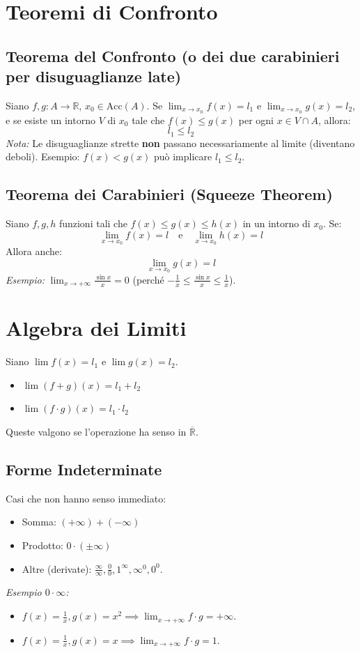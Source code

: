 \documentclass{article}
\begin{document}
\section*{Teoremi di Confronto}

\subsection*{Teorema del Confronto (o dei due carabinieri per disuguaglianze late)}
Siano $f, g: A \to \mathbb{R}$, $x_0 \in \text{Acc}(A)$.
Se $\lim_{x \to x_0} f(x) = l_1$ e $\lim_{x \to x_0} g(x) = l_2$, e se esiste un intorno $V$ di $x_0$ tale che $f(x) \le g(x)$ per ogni $x \in V \cap A$, allora:
$$ l_1 \le l_2 $$
\textit{Nota:} Le disuguaglianze strette \textbf{non} passano necessariamente al limite (diventano deboli). Esempio: $f(x) < g(x)$ può implicare $l_1 \le l_2$.

\subsection*{Teorema dei Carabinieri (Squeeze Theorem)}
Siano $f, g, h$ funzioni tali che $f(x) \le g(x) \le h(x)$ in un intorno di $x_0$.
Se:
$$ \lim_{x \to x_0} f(x) = l \quad \text{e} \quad \lim_{x \to x_0} h(x) = l $$
Allora anche:
$$ \lim_{x \to x_0} g(x) = l $$
\textit{Esempio:} $\lim_{x \to +\infty} \frac{\sin x}{x} = 0$ (perché $-\frac{1}{x} \le \frac{\sin x}{x} \le \frac{1}{x}$).

\section*{Algebra dei Limiti}
Siano $\lim f(x) = l_1$ e $\lim g(x) = l_2$.
\begin{itemize}
    \item $\lim (f+g)(x) = l_1 + l_2$
    \item $\lim (f \cdot g)(x) = l_1 \cdot l_2$
\end{itemize}
Queste valgono se l'operazione ha senso in $\overline{\mathbb{R}}$.

\subsection*{Forme Indeterminate}
Casi che non hanno senso immediato:
\begin{itemize}
    \item Somma: $(+\infty) + (-\infty)$
    \item Prodotto: $0 \cdot (\pm \infty)$
    \item Altre (derivate): $\frac{\infty}{\infty}, \frac{0}{0}, 1^\infty, \infty^0, 0^0$.
\end{itemize}
\textit{Esempio $0 \cdot \infty$:}
\begin{itemize}
    \item $f(x)=\frac{1}{x}, g(x)=x^2 \implies \lim_{x \to +\infty} f \cdot g = +\infty$.
    \item $f(x)=\frac{1}{x}, g(x)=x \implies \lim_{x \to +\infty} f \cdot g = 1$.
\end{itemize}
\end{document}
